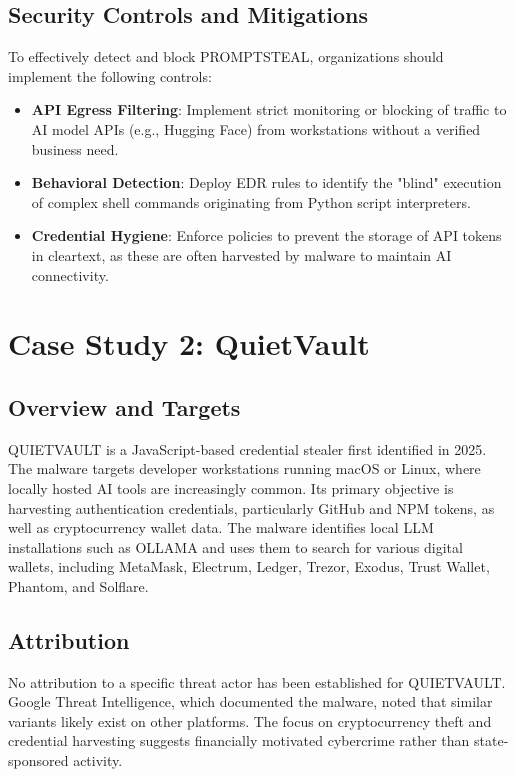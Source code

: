 \documentclass[11pt,a4paper]{article}
\begin{document}
\subsection{Security Controls and Mitigations}
To effectively detect and block PROMPTSTEAL, organizations should implement the following controls:
\begin{itemize}
    \item \textbf{API Egress Filtering}: Implement strict monitoring or blocking of traffic to AI model APIs (e.g., Hugging Face) from workstations without a verified business need.
    \item \textbf{Behavioral Detection}: Deploy EDR rules to identify the "blind" execution of complex shell commands originating from Python script interpreters.
    \item \textbf{Credential Hygiene}: Enforce policies to prevent the storage of API tokens in cleartext, as these are often harvested by malware to maintain AI connectivity.
\end{itemize}
\newpage

\section{Case Study 2: QuietVault}

\subsection{Overview and Targets}

QUIETVAULT is a JavaScript-based credential stealer first identified in 2025. The malware targets developer workstations running macOS or Linux, where locally hosted AI tools are increasingly common. Its primary objective is harvesting authentication credentials, particularly GitHub and NPM tokens, as well as cryptocurrency wallet data. The malware identifies local LLM installations such as OLLAMA and uses them to search for various digital wallets, including MetaMask, Electrum, Ledger, Trezor, Exodus, Trust Wallet, Phantom, and Solflare.

\subsection{Attribution}

No attribution to a specific threat actor has been established for QUIETVAULT. Google Threat Intelligence, which documented the malware, noted that similar variants likely exist on other platforms. The focus on cryptocurrency theft and credential harvesting suggests financially motivated cybercrime rather than state-sponsored activity.
\end{document}
